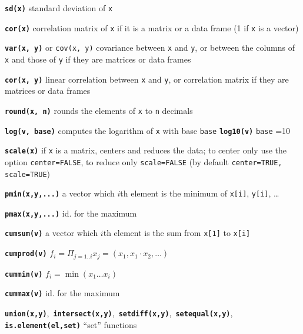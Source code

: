 \documentclass[8pt,landscape]{article}
\newcommand{\code}{\texttt}
\newcommand{\bcode}[1]{\texttt{\textbf{#1}}}
\begin{document}
\begin{multicols*}{3}
\bcode{sd(x)} standard deviation of \code{x}

\bcode{cor(x)}  correlation matrix of \code{x} if it is a matrix or a
data frame (1 if \code{x} is a vector)

\bcode{var(x, y)} or \code{cov(x, y)}  covariance between \code{x} and \code{y}, or between the columns of \code{x} and those of \code{y} if they are matrices or data frames

\bcode{cor(x, y)}  linear correlation between \code{x} and \code{y}, or correlation matrix if they are matrices or data frames


\bcode{round(x, n)}  rounds the elements of \code{x} to \code{n}
decimals

\bcode{log(v, base)}  computes the logarithm of \code{x} with base \code{base} 
\bcode{log10(v)}  \code{base} =10

\bcode{scale(x)}  if \code{x} is a matrix, centers and reduces the data; to center only use the option \code{center=FALSE}, to reduce only \code{scale=FALSE} (by default \code{center=TRUE, scale=TRUE})

\bcode{pmin(x,y,...)}  a vector which $i$th element is the minimum of \code{x[i]}, \code{y[i]}, \ldots

\bcode{pmax(x,y,...)}  id. for the maximum

\bcode{cumsum(v)}  a vector which $i$th element is the sum from \code{x[1]} to \code{x[i]}

\bcode{cumprod(v)}  $f_i = \Pi_{j=1..i} x_j = (x_1, x_1 \cdot x_2, \dots)$

\bcode{cummin(v)}  $f_i = \min(x_1 \dots x_i)$

\bcode{cummax(v)}  id. for the maximum

\bcode{union(x,y)},~\bcode{intersect(x,y)},~\bcode{setdiff(x,y)},~\bcode{setequal(x,y)}, \bcode{is.element(el,set)} ``set'' functions







\end{multicols*}
\end{document}
